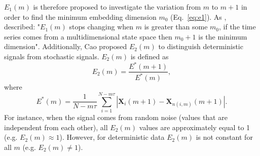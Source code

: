 $E_1(m)$ is therefore proposed to investigate the variation from $m$ to $m+1$
in order to find the minimum embedding dimension $m_0$ (Eq.~\ref{eq:e1}).
As \cite{Cao1997}, described: "$E_1(m)$ stops changing when $m$ is greater
than some $m_0$, if the time series comes from a multidimensional state space
then $m_0 + 1$ is the minimum dimension".
Additionally, Cao proposed $E_2(m)$ to distinguish deterministic signals from
stochastic signals. $E_2(m)$ is defined as
\begin{equation}\label{eq:e2}
E_2(m) = \frac{ E^* (m+1) } { E^*(m)},
\end{equation}
where
\begin{equation}\label{eq:ee}
E^*(m) = \frac{1}{N-m\tau} \sum_{i=1}^{N-m\tau}
|  \boldsymbol{X}_i(m+1) - \boldsymbol{X}_{n(i,m)}(m+1) |.
\end{equation}
For instance, when the signal comes from random noise (values that are independent from each other), 
all $E_2(m)$ values are approximately equal to 1 (e.g. $E_2(m) \approx 1$).
However, for deterministic data $E_2(m)$ is not constant for all $m$ (e.g. $E_2(m) \neq 1$).

